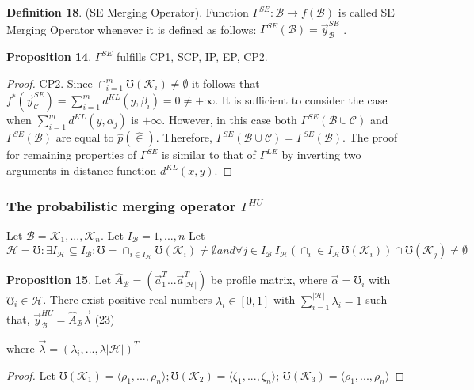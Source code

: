 \documentclass[]{iosart2c}
\begin{document}
    \textbf{Definition 18}. (SE Merging Operator). Function
    $\Gamma^{SE} : \mathcal{B} \to f(\mathcal{B})$ is called SE Merging Operator
    whenever it is defined as follows:
    $\Gamma^{SE}(\mathcal{B}) = \vec{y}^{SE}_\mathcal{B}$ .

    \textbf{Proposition 14}.
    $\Gamma^{SE}$ fulfills CP1, SCP, IP, EP, CP2.

    \begin{proof}
        CP2. Since $\cap^m_{i=1}\mho(\mathcal{K}_i) \neq \emptyset$ it follows that
        $f^*(\vec{y}^{SE}_\mathcal{C} ) = \sum^m_{i=1} d^{KL}(y, \beta_i) = 0 \neq +\infty$. It is sufficient
        to consider the case when $\sum^m_{i=1} d^{KL}(y, \alpha_j)$
        is $+\infty$. However, in this case both $\Gamma^{SE}(\mathcal{B} \cup \mathcal{C})$ and
        $\Gamma^{SE}(\mathcal{B})$ are equal to $\hat{p}(\hat{\in})$. Therefore, $\Gamma^{SE}(\mathcal{B} \cup \mathcal{C}) =
        \Gamma^{SE}(\mathcal{B})$. The proof for remaining properties of $\Gamma^{SE}$
        is similar to that of $\Gamma^{LE}$ by inverting two arguments
        in distance function $d^{KL}(x, y)$.
    \end{proof}

    \subsubsection{The probabilistic merging operator $\Gamma^{HU}$}

    Let  $\mathcal{B} = {\mathcal{K}_1, ...,\mathcal{K}_n}$. Let $I_\mathcal{B} = {1, ..., n} $
    Let $\mathcal{H} = { \mho : \exists I_\mathcal{H} \subseteq I_\mathcal{B} : \mho = \cap_{i \in I_\mathcal{H}} \mho(\mathcal{K}_i) \neq \emptyset and \forall j \in I_\mathcal{B} \ I_\mathcal{H}(\cap_i\in I_\mathcal{H} \mho(\mathcal{K}_i)) \cap \mho(\mathcal{K}_j) \neq \emptyset }$

    \textbf{Proposition 15}. Let $\hat{A}_\mathcal{B} = (\vec{a}^T_1 ...\vec{a}^T_|\mathcal{H}|)$ be profile
    matrix, where $\vec{\alpha} = \mho_i$ with $\mho_i \in \mathcal{H}$. There exist positive
    real numbers $\lambda_i \in [0, 1]$ with $\sum^{|\mathcal{H}|}_{i=1} \lambda_i = 1$ such
    that,
    $\vec{y}^{HU}_\mathcal{B} = \hat{A}_\mathcal{B}\vec{\lambda}$ (23)

    where $\vec{\lambda} = (\lambda_i, ..., \lambda|\mathcal{H}|)^T$

    \begin{proof}
        Let $\mho(\mathcal{K}_1)=\langle \rho_1, ..., \rho_n \rangle;\mho(\mathcal{K}_2)=\langle\zeta_1, ..., \zeta_n \rangle$;
        $\mho(\mathcal{K}_3) = \langle\rho_1, ..., \rho_n\rangle$
    \end{proof}
\end{document}
